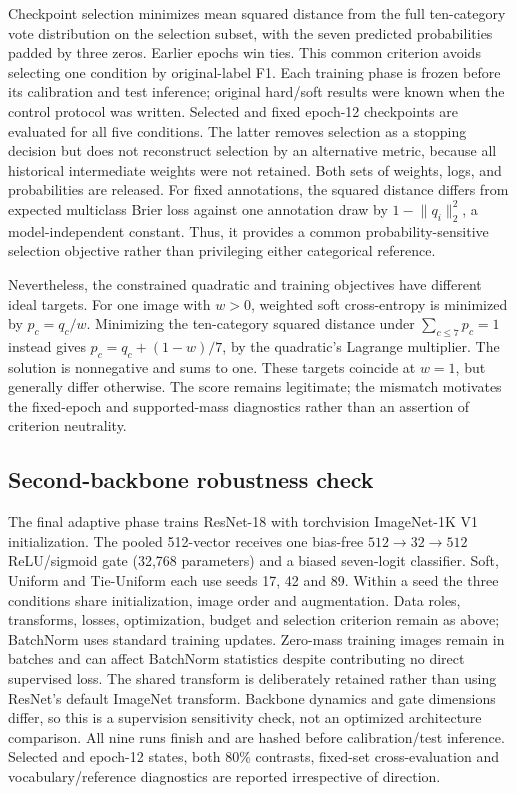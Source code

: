 \documentclass[pdflatex,sn-mathphys-num]{sn-jnl}
\begin{document}
Checkpoint selection minimizes mean squared distance from the full ten-category vote distribution on the selection subset, with the seven predicted probabilities padded by three zeros. Earlier epochs win ties. This common criterion avoids selecting one condition by original-label F1. Each training phase is frozen before its calibration and test inference; original hard/soft results were known when the control protocol was written. Selected and fixed epoch-12 checkpoints are evaluated for all five conditions. The latter removes selection as a stopping decision but does not reconstruct selection by an alternative metric, because all historical intermediate weights were not retained. Both sets of weights, logs, and probabilities are released.
For fixed annotations, the squared distance differs from expected multiclass Brier loss against one annotation draw by $1-\lVert q_i\rVert_2^2$, a model-independent constant. Thus, it provides a common probability-sensitive selection objective rather than privileging either categorical reference.

Nevertheless, the constrained quadratic and training objectives have different ideal targets. For one image with $w>0$, weighted soft cross-entropy is minimized by $p_c=q_c/w$. Minimizing the ten-category squared distance under $\sum_{c\leq7}p_c=1$ instead gives $p_c=q_c+(1-w)/7$, by the quadratic's Lagrange multiplier. The solution is nonnegative and sums to one. These targets coincide at $w=1$, but generally differ otherwise. The score remains legitimate; the mismatch motivates the fixed-epoch and supported-mass diagnostics rather than an assertion of criterion neutrality.

\subsection{Second-backbone robustness check}
The final adaptive phase trains ResNet-18 \cite{he2016resnet} with torchvision ImageNet-1K V1 initialization. The pooled 512-vector receives one bias-free $512\!\to\!32\!\to\!512$ ReLU/sigmoid gate (32,768 parameters) and a biased seven-logit classifier. Soft, Uniform and Tie-Uniform each use seeds 17, 42 and 89. Within a seed the three conditions share initialization, image order and augmentation. Data roles, transforms, losses, optimization, budget and selection criterion remain as above; BatchNorm uses standard training updates. Zero-mass training images remain in batches and can affect BatchNorm statistics despite contributing no direct supervised loss. The shared transform is deliberately retained rather than using ResNet's default ImageNet transform. Backbone dynamics and gate dimensions differ, so this is a supervision sensitivity check, not an optimized architecture comparison. All nine runs finish and are hashed before calibration/test inference. Selected and epoch-12 states, both 80\% contrasts, fixed-set cross-evaluation and vocabulary/reference diagnostics are reported irrespective of direction.
\end{document}

